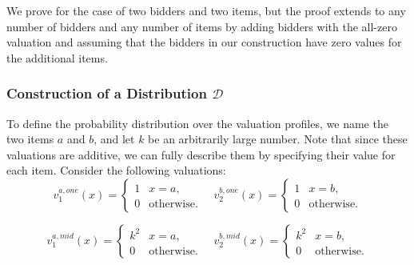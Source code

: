 We prove for the case of two bidders and two items, but the proof extends to any number of bidders and any number of items by adding bidders with the all-zero valuation and assuming that the bidders in our construction have zero values for the additional items.

\begin{comment}
The outline of the proof is as follows. 
In \cref{subsubsec-description-add},
we describe the  hard distribution $\mathcal D$. 
In \cref{subsubsec-performance-add}, we state the allocation of a deterministic mechanism 
that gives an approximation better than $\frac{7}{8}$ to the optimal welfare.  
We conclude by further analyzing the allocation and payments of a deterministic \textquote{good} mechanism in several scenarios, and explaining why these properties  imply that  a \textquote{good} mechanism does not exist (\cref{subsubsec-contradiction-add}).
We defer  technical proofs to \cref{app-claims-proofs-add} and \cref{subsubsec-prop-alloc-add}.

We prove for the case of two bidders and two items, but the proof extends to any number of bidders and any number of items by adding bidders with the all-zero valuation and assuming that the bidders in our construction have zero values for the additional items.
\end{comment}

\subsubsection[Construction of a "Hard" Distribution D]{Construction of a  Distribution $\mathcal D$} \label{subsubsec-description-add}
    To define the probability distribution over the valuation profiles, we name the two items $a$ and $b$, and let $k$ be an arbitrarily large number. Note that since these valuations are additive, we can fully describe them by specifying their value for each item.
    Consider the following valuations:  
\[
v_1^{{a,one}}(x) = 
\begin{cases}
1 & x=a,\\
0 & \text{otherwise.}
\end{cases} \quad 
v_2^{{b,one}}(x) = 
\begin{cases}
1 & x=b,\\
0 & \text{otherwise.}
\end{cases}
\]

\[
v_1^{{a,mid}}(x) = 
\begin{cases}
k^2 & x=a,\\
0 & \text{otherwise.}
\end{cases} \quad 
v_2^{{b,mid}}(x) = 
\begin{cases}
k^2 & x=b,\\
0 & \text{otherwise.}
\end{cases}
\]

